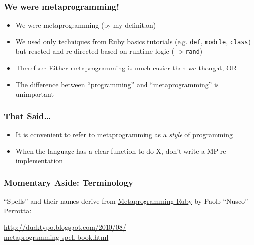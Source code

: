\documentclass[slidestop,compress,mathserif]{beamer}
\begin{document}
\begin{frame}
	\frametitle{We were metaprogramming!}
	\begin{itemize}
		\item We were metaprogramming (by my definition)
		\pause
		\item We used only techniques from Ruby basics tutorials (e.g. \texttt{def},
\texttt{module}, \texttt{class}) but reacted and re-directed based on runtime
logic ( \texttt{$>$rand})
		\pause
		\item Therefore:  Either metaprogramming is much easier than we thought, OR
		\pause
		\item The difference between ``programming'' and ``metaprogramming'' is unimportant
	\end{itemize}
\end{frame}

\begin{frame}
	\frametitle{That Said\ldots}
	\begin{itemize}
		\item It is convenient to refer to metaprogramming as a \emph{style} of programming
		\item When the language has a clear function to do X, don't write a MP re-implementation
	\end{itemize}
\end{frame}

\begin{frame}
	\frametitle{Momentary Aside: Terminology}
	``Spells'' and their names derive from \underline{Metaprogramming Ruby} by Paolo ``Nusco'' Perrotta:
	\vskip 0.5cm
	\begin{center}
		\underline{http://ducktypo.blogspot.com/2010/08/} \\
		\underline{metaprogramming-spell-book.html}
	\end{center}
\end{frame}
\end{document}
